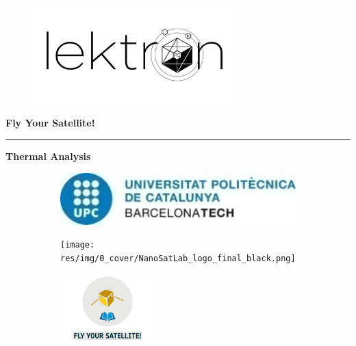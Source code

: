 \clearpage
{}
\thispagestyle{empty}
\begin{center}
{\sffamily 

\begin{figure}[ht]
    \centering
    \includegraphics[width=0.7\textwidth]{res/img/0_cover/lektron&patch.png}
    \label{fig:pocatLektron_patch}
\end{figure}

\vspace{1cm}
{\Huge \textbf{Fly Your Satellite!}}
\vspace{0.5cm}
{\color{black}\hrule height 1pt}
\vspace{0.5cm}
{\qquad \qquad \qquad {}}
\vspace{0.5cm}
\newline
{\LARGE \textbf{Thermal Analysis}}
\vskip -3cm

\begin{figure}
    \centering
    \begin{subfigure}{0.4\textwidth}
        \centering
        \includegraphics[width=\textwidth]{res/img/0_cover/upclogo.png}
    \end{subfigure} \hfill
    \begin{subfigure}{0.4\textwidth}
        \centering
        \texttt{[image: res/img/0\_cover/NanoSatLab\_logo\_final\_black.png]}
    \end{subfigure}
    \vskip 1cm
    \begin{subfigure}{\textwidth}
        \centering
        \includegraphics[width=0.4\textwidth]{res/img/0_cover/FYS_logo.jpg}
    \end{subfigure}
\end{figure}
}

\end{center}